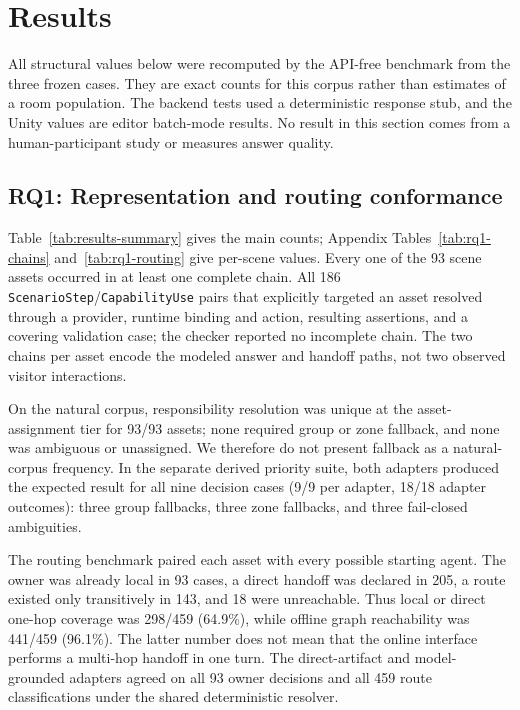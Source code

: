 \section{Results}

All structural values below were recomputed by the API-free benchmark from the
three frozen cases. They are exact counts for this corpus rather than estimates
of a room population. The backend tests used a deterministic response stub, and
the Unity values are editor batch-mode results. No result in this section comes
from a human-participant study or measures answer quality.



\subsection{RQ1: Representation and routing conformance}

Table~\ref{tab:results-summary} gives the main counts; Appendix
Tables~\ref{tab:rq1-chains} and~\ref{tab:rq1-routing} give per-scene values.
Every one of the 93 scene assets occurred in at least one complete chain. All 186
\texttt{ScenarioStep}/\texttt{CapabilityUse} pairs that explicitly targeted an
asset resolved through a provider, runtime binding and action, resulting
assertions, and a covering validation case; the checker reported no incomplete
chain. The two chains per asset encode the modeled answer and handoff paths,
not two observed visitor interactions.

On the natural corpus, responsibility resolution was unique at the
asset-assignment tier for 93/93 assets; none required group or zone fallback,
and none was ambiguous or unassigned. We therefore do not present fallback as
a natural-corpus frequency. In the separate derived priority suite, both
adapters produced the expected result for all nine decision cases
(9/9 per adapter, 18/18 adapter outcomes): three group fallbacks, three zone
fallbacks, and three fail-closed ambiguities.

The routing benchmark paired each asset with every possible starting agent.
The owner was already local
in 93 cases, a direct handoff was declared in 205, a route existed only
transitively in 143, and 18 were unreachable. Thus local or direct one-hop
coverage was 298/459 (64.9\%), while offline graph reachability was 441/459
(96.1\%). The latter number does not mean that the online interface performs a
multi-hop handoff in one turn. The direct-artifact and model-grounded adapters
agreed on all 93 owner decisions and all 459 route classifications under the
shared deterministic resolver.

